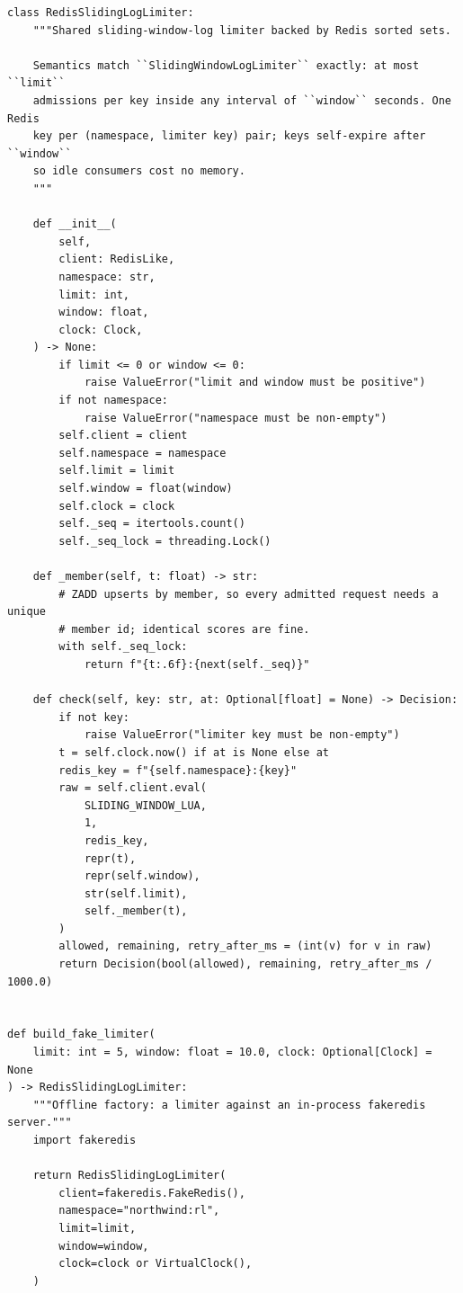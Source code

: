 \begin{verbatim}
class RedisSlidingLogLimiter:
    """Shared sliding-window-log limiter backed by Redis sorted sets.

    Semantics match ``SlidingWindowLogLimiter`` exactly: at most ``limit``
    admissions per key inside any interval of ``window`` seconds. One Redis
    key per (namespace, limiter key) pair; keys self-expire after ``window``
    so idle consumers cost no memory.
    """

    def __init__(
        self,
        client: RedisLike,
        namespace: str,
        limit: int,
        window: float,
        clock: Clock,
    ) -> None:
        if limit <= 0 or window <= 0:
            raise ValueError("limit and window must be positive")
        if not namespace:
            raise ValueError("namespace must be non-empty")
        self.client = client
        self.namespace = namespace
        self.limit = limit
        self.window = float(window)
        self.clock = clock
        self._seq = itertools.count()
        self._seq_lock = threading.Lock()

    def _member(self, t: float) -> str:
        # ZADD upserts by member, so every admitted request needs a unique
        # member id; identical scores are fine.
        with self._seq_lock:
            return f"{t:.6f}:{next(self._seq)}"

    def check(self, key: str, at: Optional[float] = None) -> Decision:
        if not key:
            raise ValueError("limiter key must be non-empty")
        t = self.clock.now() if at is None else at
        redis_key = f"{self.namespace}:{key}"
        raw = self.client.eval(
            SLIDING_WINDOW_LUA,
            1,
            redis_key,
            repr(t),
            repr(self.window),
            str(self.limit),
            self._member(t),
        )
        allowed, remaining, retry_after_ms = (int(v) for v in raw)
        return Decision(bool(allowed), remaining, retry_after_ms / 1000.0)


def build_fake_limiter(
    limit: int = 5, window: float = 10.0, clock: Optional[Clock] = None
) -> RedisSlidingLogLimiter:
    """Offline factory: a limiter against an in-process fakeredis server."""
    import fakeredis

    return RedisSlidingLogLimiter(
        client=fakeredis.FakeRedis(),
        namespace="northwind:rl",
        limit=limit,
        window=window,
        clock=clock or VirtualClock(),
    )
\end{verbatim}

